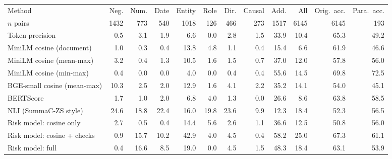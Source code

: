 \begin{tabular}{lrrrrrrrrrrr}
\toprule
Method & Neg. & Num. & Date & Entity & Role & Dir. & Causal & Add. & All & Orig.\ acc. & Para.\ acc. \\
$n$ pairs & 1432 & 773 & 540 & 1018 & 126 & 466 & 273 & 1517 & 6145 & 6145 & 193 \\
\midrule
Token precision & 0.5 & 3.1 & 1.9 & 6.6 & 0.0 & 2.8 & 1.5 & 33.9 & 10.4 & 65.3 & 49.2 \\
MiniLM cosine (document) & 1.0 & 0.3 & 0.4 & 13.8 & 4.8 & 1.1 & 0.4 & 15.4 & 6.6 & 61.9 & 46.6 \\
MiniLM cosine (mean-max) & 3.2 & 0.4 & 1.3 & 10.5 & 1.6 & 1.5 & 0.7 & 37.0 & 12.0 & 57.8 & 56.0 \\
MiniLM cosine (min-max) & 0.4 & 0.0 & 0.0 & 4.0 & 0.0 & 0.4 & 0.4 & 55.6 & 14.5 & 69.8 & 72.5 \\
BGE-small cosine (mean-max) & 10.3 & 2.5 & 2.0 & 12.9 & 1.6 & 4.1 & 2.2 & 35.2 & 14.1 & 54.0 & 45.1 \\
\midrule
BERTScore & 1.7 & 1.0 & 2.0 & 6.8 & 4.0 & 1.3 & 0.0 & 26.6 & 8.6 & 63.8 & 58.5 \\
NLI (SummaC-ZS style) & 24.6 & 18.8 & 22.4 & 16.0 & 19.8 & 23.6 & 9.9 & 12.3 & 18.4 & 52.3 & 56.5 \\
\midrule
Risk model: cosine only & 2.7 & 0.5 & 0.4 & 14.4 & 5.6 & 2.6 & 1.1 & 36.6 & 12.5 & 50.8 & 56.0 \\
Risk model: cosine + checks & 0.9 & 15.7 & 10.2 & 42.9 & 4.0 & 4.5 & 0.4 & 58.2 & 25.0 & 67.3 & 61.1 \\
Risk model: full & 0.4 & 16.6 & 8.5 & 19.0 & 0.0 & 4.5 & 1.5 & 48.3 & 18.4 & 63.1 & 53.9 \\
\bottomrule
\end{tabular}
